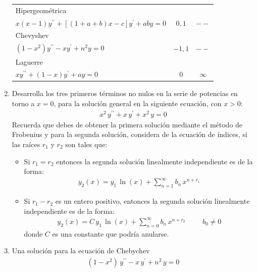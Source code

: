 \documentclass[hidelinks,12pt]{article}
\newcommand{\pderivada}[1]{\ensuremath{{#1}^{\prime}}}
\newcommand{\sderivada}[1]{\ensuremath{{#1}^{\prime \prime}}}
\begin{document}
\begin{enumerate}
\begin{table}[H]
\begin{tabular}{l c c}
                Hipergeométrica & & \\
                $x (x-1) \sderivada{y} + [(1 + a + b) x - c] \pderivada{y} + a b y = 0$ & $0, 1$ & $--$ \\
                Chevyshev & & \\
                $(1 - x^{2}) \sderivada{y} - x \pderivada{y} + n^{2} y = 0$ & $- 1, 1$ & $--$ \\
                Laguerre & & \\
                $x \sderivada{y} + (1 - x) \pderivada{y} + a y = 0$ & $0$ & $\infty$
            \end{tabular}
        \end{table}
    \item Desarrolla los tres primeros términos no nulos en la serie de potencias en torno a $x = 0$, para la solución general en la siguiente ecuación, con $x > 0$:
        \begin{align*}
            x^{2} \, \sderivada{y} + x \, \pderivada{y} + x^{2} \, y = 0
        \end{align*}
        Recuerda que debes de obtener la primera solución mediante el método de Frobenius y para la segunda solución, considera de la ecuación de índices, si las raíces $r_{1}$ y $r_{2}$ son tales que:
        \begin{itemize}
            \item Si $r_{1} = r_{2}$ entonces la segunda solución linealmente independiente es de la forma:
                \begin{align*}
                    y_{2} (x) = y_{1} \, \ln(x) + \sum_{n=1}^{\infty} b_{n} \, x^{n+r_{1}}
                \end{align*} 
            \item Si $r_{1} - r_{2}$ es un entero positivo, entonces la segunda solución linealmente independiente es de la forma:
            \begin{align*}
                y_{2} (x) = C \, y_{1} \, \ln(x) + \sum_{n=0}^{\infty} b_{n} \, x^{n+r_{2}} \hspace{1cm} b_{0} \neq 0
            \end{align*}
            donde $C$ es una constante que podría anularse.
        \end{itemize}
    \item Una solución para la ecuación de Chebychev
        \begin{align*}
            (1 -x^{2}) \, \sderivada{y} - x \, \pderivada{y} + n^{2} \, y = 0
        \end{align*}

\end{enumerate}
\end{document}
